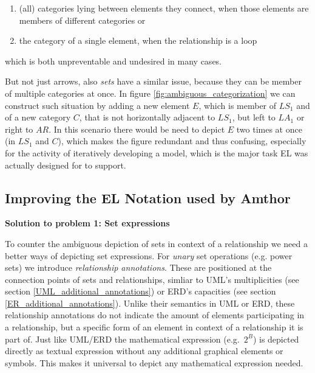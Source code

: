 \documentclass[twoside, openright, 12pt]{book}
\begin{document}
\begin{enumerate}[label=\alph*)]
\item (all) categories lying between elements they connect, when those elements are members of different categories or 
\item the category of a single element, when the relationship is a loop
\end{enumerate}

\noindent
which is both unpreventable and undesired in many cases.

But not just arrows, also \textit{sets} have a similar issue, because they can be member of multiple categories at once.
In figure \ref{fig:ambiguous_categorization} we can construct such situation by adding a new element $E$, which is member of $LS_1$ and of a new category $C$, that is not horizontally adjacent to $LS_1$, but left to $LA_1$ or right to $AR$.
In this scenario there would be need to depict $E$ two times at once (in $LS_1$ and $C$), which makes the figure redundant and thus confusing, especially for the activity of iteratively developing a model, which is the major task EL was actually designed for to support.\\


\vspace{10mm}

\subsection{Improving the EL Notation used by Amthor}
\label{improving_notation}
\vspace{2mm}
\noindent
\textbf{Solution to problem 1: Set expressions}
\vspace{1mm}

\noindent
To counter the ambiguous depiction of sets in context of a relationship we need a better ways of depicting set expressions.
For \textit{unary} set operations (e.g. power sets) we introduce \textit{relationship annotations}.
These are positioned at the connection points of sets and relationships, simliar to UML's multiplicities (see section \ref{UML_additional_annotations}) or ERD's capacities (see section \ref{ER_additional_annotations}).
Unlike their semantics in UML or ERD, these relationship annotations do not indicate the amount of elements participating in a relationship, but a specific form of an element in context of a relationship it is part of.
Just like UML/ERD the mathematical expression (e.g.~$2^B$) is depicted directly as textual expression without any additional graphical elements or symbols.
This makes it universal to depict any mathematical expression needed.
\end{document}
